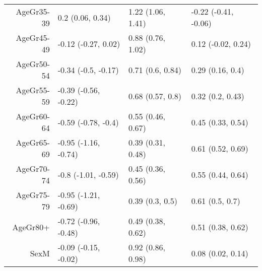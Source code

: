 \begin{table}[ht]
\begin{tabular}{rlll}
  AgeGr35-39 & 0.2 (0.06, 0.34) & 1.22 (1.06, 1.41) & -0.22 (-0.41, -0.06) \\ 
  AgeGr45-49 & -0.12 (-0.27, 0.02) & 0.88 (0.76, 1.02) & 0.12 (-0.02, 0.24) \\ 
  AgeGr50-54 & -0.34 (-0.5, -0.17) & 0.71 (0.6, 0.84) & 0.29 (0.16, 0.4) \\ 
  AgeGr55-59 & -0.39 (-0.56, -0.22) & 0.68 (0.57, 0.8) & 0.32 (0.2, 0.43) \\ 
  AgeGr60-64 & -0.59 (-0.78, -0.4) & 0.55 (0.46, 0.67) & 0.45 (0.33, 0.54) \\ 
  AgeGr65-69 & -0.95 (-1.16, -0.74) & 0.39 (0.31, 0.48) & 0.61 (0.52, 0.69) \\ 
  AgeGr70-74 & -0.8 (-1.01, -0.59) & 0.45 (0.36, 0.56) & 0.55 (0.44, 0.64) \\ 
  AgeGr75-79 & -0.95 (-1.21, -0.69) & 0.39 (0.3, 0.5) & 0.61 (0.5, 0.7) \\ 
  AgeGr80+ & -0.72 (-0.96, -0.48) & 0.49 (0.38, 0.62) & 0.51 (0.38, 0.62) \\ 
  SexM & -0.09 (-0.15, -0.02) & 0.92 (0.86, 0.98) & 0.08 (0.02, 0.14) \\ 
   \hline
\end{tabular}
\end{table}
